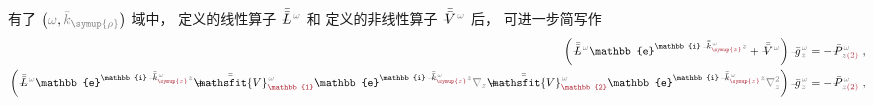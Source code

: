 有了 $\left( \mathcolor{gray}{\omega}, \mathcolor{gray}{\bar{k}_{\symup{\rho}}} \right)$ 域中，  定义的线性算子 $\Xint{\mathcolor{gray}{-}}{30}{\bar{\bar{L}}}^{\;\! \mathcolor{gray}{\omega}}$ 和  定义的非线性算子 $\Xint{\mathcolor{gray}{-}}{21}{\bar{\bar{V}}}^{\;\! \mathcolor{gray}{\omega}}$ 后， 可进一步简写作
\begin{subequations}
\begin{align}
	\left( \Xint{\mathcolor{gray}{-}}{32}{\bar{\bar{L}}}^{\;\! \mathcolor{gray}{\omega}} \mathbb{e}^{\mathbb{i} \Xint{\begin{smallmatrix} ~ \\ {}^{}_{\mathcolor{gray}{-}} \\ ~ \end{smallmatrix}}{15}{\bar{\bar{k}}}_{\textcolor{Maroon}{\symup{z}}}^{\;\! \mathcolor{gray}{\omega}} \mathcolor{gray}{z}} + \Xint{\mathcolor{gray}{-}}{25}{\bar{\bar{V}}}^{\;\! \mathcolor{gray}{\omega}} \right) \Xint{{}^{}_{\mathcolor{gray}{-}}}{10}{\bar{g}}^{\;\!\mathcolor{gray}{\omega}}_{\;\! \mathcolor{gray}{z}}
	&= - \Xint{\mathcolor{gray}{-}}{30}{\bar{P}}^{\;\! \mathcolor{gray}{\omega}}_{\;\! \mathcolor{gray}{z} \textcolor{Maroon}{(2)}} ~, \label{eq:nonlinear(2)-wave_wkrho-simplify6} \\
	\left( \Xint{\mathcolor{gray}{-}}{32}{\bar{\bar{L}}}^{\;\! \mathcolor{gray}{\omega}} \mathbb{e}^{\mathbb{i} \Xint{\begin{smallmatrix} ~ \\ {}^{}_{\mathcolor{gray}{-}} \\ ~ \end{smallmatrix}}{15}{\bar{\bar{k}}}_{\textcolor{Maroon}{\symup{z}}}^{\;\! \mathcolor{gray}{\omega}} \mathcolor{gray}{z}} + \Xint{\mathcolor{gray}{-}}{25}{\bar{\bar{\mathsfit{V}}}}^{\;\! \mathcolor{gray}{\omega}}_{\textcolor{Maroon}{\mathbb{1}}} \mathbb{e}^{\mathbb{i} \Xint{\begin{smallmatrix} ~ \\ {}^{}_{\mathcolor{gray}{-}} \\ ~ \end{smallmatrix}}{15}{\bar{\bar{k}}}_{\textcolor{Maroon}{\symup{z}}}^{\;\! \mathcolor{gray}{\omega}} \mathcolor{gray}{z}} \mathcolor{gray}{\nabla_z} + \Xint{\mathcolor{gray}{-}}{25}{\bar{\bar{\mathsfit{V}}}}^{\;\! \mathcolor{gray}{\omega}}_{\textcolor{Maroon}{\mathbb{2}}} \mathbb{e}^{\mathbb{i} \Xint{\begin{smallmatrix} ~ \\ {}^{}_{\mathcolor{gray}{-}} \\ ~ \end{smallmatrix}}{15}{\bar{\bar{k}}}_{\textcolor{Maroon}{\symup{z}}}^{\;\! \mathcolor{gray}{\omega}} \mathcolor{gray}{z}} \mathcolor{gray}{\nabla_z^2} \right) \Xint{{}^{}_{\mathcolor{gray}{-}}}{10}{\bar{g}}^{\;\!\mathcolor{gray}{\omega}}_{\;\! \mathcolor{gray}{z}}
	&= - \Xint{\mathcolor{gray}{-}}{30}{\bar{P}}^{\;\! \mathcolor{gray}{\omega}}_{\;\! \mathcolor{gray}{z} \textcolor{Maroon}{(2)}} ~, \label{eq:nonlinear(2)-wave_wkrho-simplify6-1st2nd-decompose}
\end{align}
\end{subequations}
